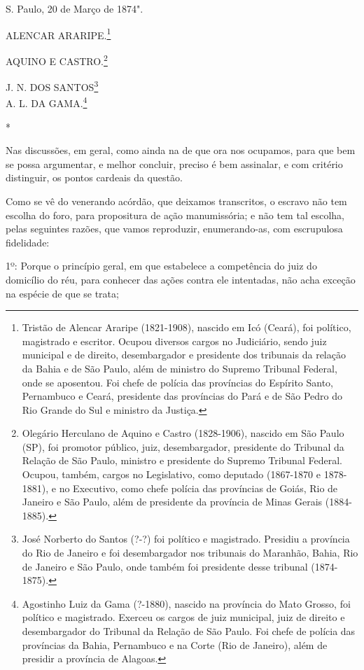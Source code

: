 S. Paulo, 20 de Março de 1874".

ALENCAR ARARIPE.\footnote{Tristão de Alencar Araripe (1821-1908),
  nascido em Icó (Ceará), foi político, magistrado e escritor. Ocupou
  diversos cargos no Judiciário, sendo juiz municipal e de direito,
  desembargador e presidente dos tribunais da relação da Bahia e de São
  Paulo, além de ministro do Supremo Tribunal Federal, onde se
  aposentou. Foi chefe de polícia das províncias do Espírito Santo,
  Pernambuco e Ceará, presidente das províncias do Pará e de São Pedro
  do Rio Grande do Sul e ministro da Justiça.}

AQUINO E CASTRO.\footnote{Olegário Herculano de Aquino e Castro
  (1828-1906), nascido em São Paulo (SP), foi promotor público, juiz,
  desembargador, presidente do Tribunal da Relação de São Paulo,
  ministro e presidente do Supremo Tribunal Federal. Ocupou, também,
  cargos no Legislativo, como deputado (1867-1870 e 1878-1881), e no
  Executivo, como chefe polícia das províncias de Goiás, Rio de Janeiro
  e São Paulo, além de presidente da província de Minas Gerais
  (1884-1885).}

J. N. DOS SANTOS\footnote{José Norberto do Santos (?-?) foi político e
  magistrado. Presidiu a província do Rio de Janeiro e foi desembargador
  nos tribunais do Maranhão, Bahia, Rio de Janeiro e São Paulo, onde
  também foi presidente desse tribunal (1874-1875).}\\
A. L. DA GAMA.\footnote{Agostinho Luiz da Gama (?-1880), nascido na
  província do Mato Grosso, foi político e magistrado. Exerceu os cargos
  de juiz municipal, juiz de direito e desembargador do Tribunal da
  Relação de São Paulo. Foi chefe de polícia das províncias da Bahia,
  Pernambuco e na Corte (Rio de Janeiro), além de presidir a província
  de Alagoas.}

*

Nas discussões, em geral, como ainda na de que ora nos ocupamos, para
que bem se possa argumentar, e melhor concluir, preciso é bem assinalar,
e com critério distinguir, os pontos cardeais da questão.

Como se vê do venerando acórdão, que deixamos transcritos, o escravo não
tem escolha do foro, para propositura de ação manumissória; e não tem
tal escolha, pelas seguintes razões, que vamos reproduzir,
enumerando-as, com escrupulosa fidelidade:

1º: Porque o princípio geral, em que estabelece a competência do juiz do
domicílio do réu, para conhecer das ações contra ele intentadas, não
acha exceção na espécie de que se trata;

